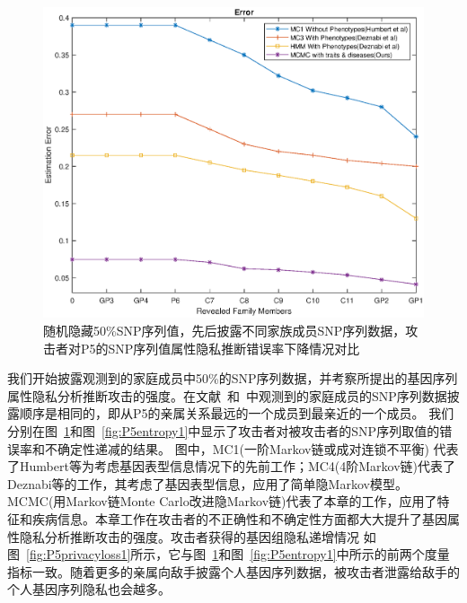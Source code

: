 \begin{figure}[htbp]
	\centering
	\includegraphics[width=0.8\linewidth]{./figures/P5error1.eps}
	\centering
	\caption{随机隐藏50\%SNP序列值，先后披露不同家族成员SNP序列数据，攻击者对P5的SNP序列值属性隐私推断错误率下降情况对比}\label{fig:P5error1}
\end{figure}


我们开始披露观测到的家庭成员中50\%的SNP序列数据，并考察所提出的基因序列属性隐私分析推断攻击的强度。在文献~\cite{humbert2013addressing,humbert2017quantifying}和~\cite{deznabi2018inference}中观测到的家庭成员的SNP序列数据披露顺序是相同的，即从P5的亲属关系最远的一个成员到最亲近的一个成员。 我们分别在图~\ref{fig:P5error1}和图~\ref{fig:P5entropy1}中显示了攻击者对被攻击者的SNP序列取值的错误率和不确定性递减的结果。 图中，MC1(一阶Markov链或成对连锁不平衡) 代表了Humbert等为考虑基因表型信息情况下的先前工作；MC4(4阶Markov链)代表了Deznabi等的工作，其考虑了基因表型信息，应用了简单隐Markov模型。MCMC(用Markov链Monte Carlo改进隐Markov链)代表了本章的工作，应用了特征和疾病信息。本章工作在攻击者的不正确性和不确定性方面都大大提升了基因属性隐私分析推断攻击的强度。攻击者获得的基因组隐私递增情况 如图~\ref{fig:P5privacyloss1}所示，它与图~\ref{fig:P5error1}和图~\ref{fig:P5entropy1}中所示的前两个度量指标一致。随着更多的亲属向敌手披露个人基因序列数据，被攻击者泄露给敌手的个人基因序列隐私也会越多。

